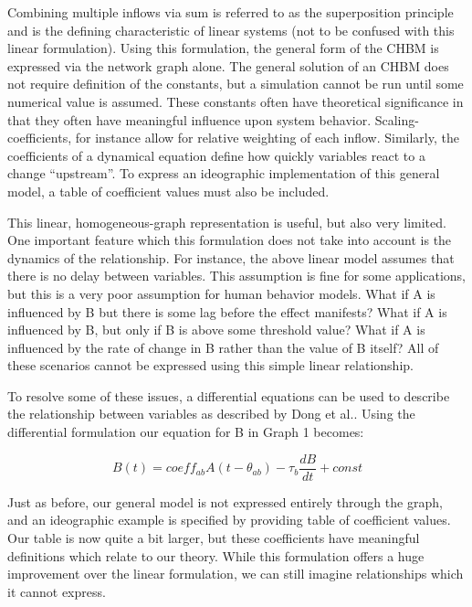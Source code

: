 \documentclass[runningheads,a4paper]{llncs}
\begin{document}
Combining multiple inflows via sum is referred to as the superposition principle and is the defining characteristic of linear systems (not to be confused with this linear formulation).
Using this formulation, the general form of the CHBM is expressed via the network graph alone.
The general solution of an CHBM does not require definition of the constants, but a simulation cannot be run until some numerical value is assumed. 
These constants often have theoretical significance in that they often have meaningful influence upon system behavior. 
Scaling-coefficients, for instance allow for relative weighting of each inflow. 
Similarly, the coefficients of a dynamical equation define how quickly variables react to a change ``upstream''.
To express an ideographic implementation of this general model, a table of coefficient values must also be included. 

This linear, homogeneous-graph representation is useful, but also very limited.
One important feature which this formulation does not take into account is the dynamics of the relationship.
For instance, the above linear model assumes that there is no delay between variables.
This assumption is fine for some applications, but this is a very poor assumption for human behavior models. 
What if A is influenced by B but there is some lag before the effect manifests?
What if A is influenced by B, but only if B is above some threshold value? 
What if A is influenced by the rate of change in B rather than the value of B itself? 
All of these scenarios cannot be expressed using this simple linear relationship. 

To resolve some of these issues, a differential equations can be used to describe the relationship between variables as described by Dong et al.\cite{dong2012dynamical}. 
Using the differential formulation our equation for B in Graph 1 becomes:

\begin{equation}
    B(t) = coeff_{ab}A(t-\theta_{ab}) - \tau_{b}\frac{dB}{dt} + const
    \label{fluid-flow-eq}
\end{equation}

Just as before, our general model is not expressed entirely through the graph, and an  ideographic example is specified by providing table of coefficient values.
Our table is now quite a bit larger, but these coefficients have meaningful definitions which relate to our theory.
While this formulation offers a huge improvement over the linear formulation, we can still imagine relationships which it cannot express.
\end{document}
